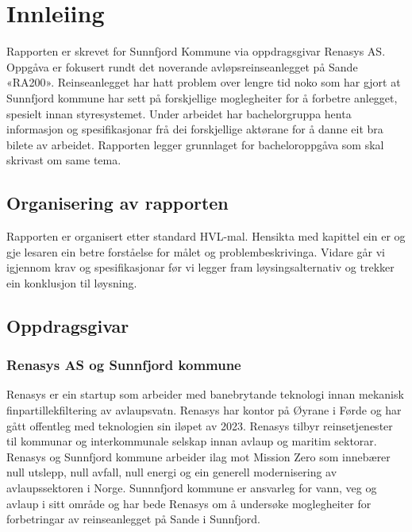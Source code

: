 \chapter{Innleiing}
\thispagestyle{fancy}
Rapporten er skrevet for Sunnfjord Kommune via oppdragsgivar Renasys AS.
Oppgåva er fokusert rundt det noverande avløpsreinseanlegget på Sande «RA200». Reinseanlegget har hatt 
problem over lengre tid noko som har gjort at Sunnfjord kommune har sett på forskjellige moglegheiter for å 
forbetre anlegget, spesielt innan styresystemet.
Under arbeidet har bachelorgruppa henta informasjon og spesifikasjonar frå dei forskjellige aktørane for å 
danne eit bra bilete av arbeidet. Rapporten legger grunnlaget for bacheloroppgåva som skal skrivast om same 
tema.

\newpage
\section{Organisering av rapporten}
Rapporten er organisert etter standard HVL-mal.
Hensikta med kapittel ein er og gje lesaren ein betre forståelse for målet og problembeskrivinga. 
Vidare går vi igjennom krav og spesifikasjonar før vi legger fram løysingsalternativ og trekker ein konklusjon til løysning.

\section{Oppdragsgivar}

\subsection{Renasys AS og Sunnfjord kommune}
Renasys er ein startup som arbeider med banebrytande teknologi innan mekanisk finpartillekfiltering av avlaupsvatn.
Renasys har kontor på Øyrane i Førde og har gått offentleg med teknologien sin iløpet av 2023. Renasys tilbyr reinsetjenester til kommunar og interkommunale selskap innan avlaup og maritim sektorar.
\newline
Renasys og Sunnfjord kommune arbeider ilag mot Mission Zero som innebærer null utslepp, null avfall, null energi og ein generell modernisering av avlaupssektoren i Norge.
Sunnnfjord kommune er ansvarleg for vann, veg og avlaup i sitt område og har bede Renasys om å undersøke moglegheiter for forbetringar av reinseanlegget på Sande i Sunnfjord.